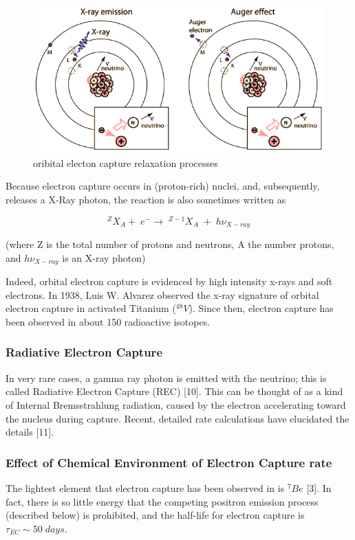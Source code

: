 \documentclass[11pt]{amsart}
\begin{document}
\begin{figure}
   \includegraphics[scale=0.5]{img/ecrelax.png}
   \caption{oribital electon capture relaxation processes}
  \label{fig:ec1}
\end{figure}

Because electron capture occurs in (proton-rich) nuclei, and, subsequently, releases a X-Ray photon, the reaction is also sometimes written as

$$^{Z}X_{A}+\;e^{-}\rightarrow\;^{Z-1}X_{A}\;+\;h\nu_{X-ray}$$

(where Z is the total number of protons and neutrons, A the number protons, and $h\nu_{X-ray}$ is an X-ray photon)

Indeed, orbital electron capture is evidenced by high intensity x-rays and soft electrons.  In 1938, Luis W. Alvarez observed the x-ray signature of orbital electron capture in activated Titanium ($^{48}V$). Since then, electron capture has been observed in about 150 radioactive isotopes.


\subsubsection{Radiative Electron Capture}

In very rare cases, a gamma ray photon is emitted with the neutrino; this is called Radiative Electron Capture (REC) [10]. This can be thought of as a kind of Internal Bremsstrahlung radiation, caused by the electron accelerating toward the nucleus during capture. Recent, detailed rate calculations have elucidated the details [11].

\subsubsection{Effect of Chemical Environment of Electron Capture rate} 
The lightest element that electron capture has been observed in is $^{7}Be$ [3]. In fact, there is so little energy that the competing positron emission process (described below) is prohibited, and the half-life for electron capture is $\tau_{EC}\sim 50\;days$.
\end{document}

